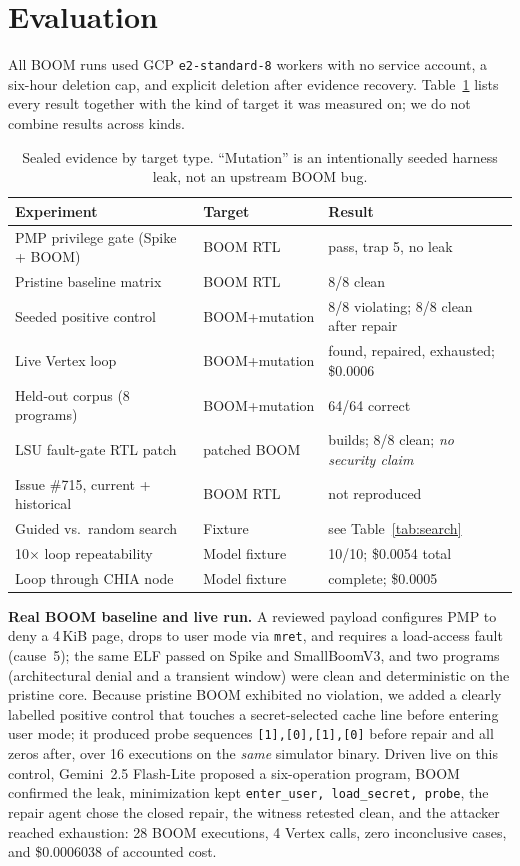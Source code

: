 \documentclass[conference,10pt]{IEEEtran}
\begin{document}
\section{Evaluation}\label{sec:eval}
All BOOM runs used GCP \texttt{e2-standard-8} workers with no service account,
a six-hour deletion cap, and explicit deletion after evidence recovery.
Table~\ref{tab:evidence} lists every result together with the kind of
target it was measured on; we do not combine results across kinds.

\begin{table}[t]
\centering
\caption{Sealed evidence by target type. ``Mutation'' is an intentionally
seeded harness leak, not an upstream BOOM bug.}
\label{tab:evidence}
\footnotesize
\setlength{\tabcolsep}{3pt}
\begin{tabular}{@{}p{}p{}p{}@{}}
\toprule
Experiment & Target & Result \\
\midrule
PMP privilege gate (Spike + BOOM) & BOOM RTL & pass, trap 5, no leak \\
Pristine baseline matrix & BOOM RTL & 8/8 clean \\
Seeded positive control & BOOM+mutation & 8/8 violating; 8/8 clean after repair \\
Live Vertex loop & BOOM+mutation & found, repaired, exhausted; \$0.0006 \\
Held-out corpus (8 programs) & BOOM+mutation & 64/64 correct \\
LSU fault-gate RTL patch & patched BOOM & builds; 8/8 clean; \emph{no security claim} \\
Issue \#715, current + historical & BOOM RTL & not reproduced \\
Guided vs.\ random search & Fixture & see Table~\ref{tab:search} \\
10$\times$ loop repeatability & Model fixture & 10/10; \$0.0054 total \\
Loop through CHIA node & Model fixture & complete; \$0.0005 \\
\bottomrule
\end{tabular}
\end{table}

\textbf{Real BOOM baseline and live run.} A reviewed payload configures PMP to
deny a 4\,KiB page, drops to user mode via \texttt{mret}, and requires a
load-access fault (cause~5); the same ELF passed on Spike and SmallBoomV3, and two
programs (architectural denial and a transient window) were clean and
deterministic on the pristine core. Because pristine BOOM exhibited no violation,
we added a clearly labelled positive control that touches a secret-selected cache
line before entering user mode; it produced probe sequences
\texttt{[1],[0],[1],[0]} before repair and all zeros after, over 16 executions on
the \emph{same} simulator binary. Driven live on this control, Gemini~2.5
Flash-Lite proposed a six-operation program, BOOM confirmed the leak,
minimization kept \texttt{enter\_user, load\_secret, probe}, the repair agent
chose the closed repair, the witness retested clean, and the attacker reached
exhaustion: 28 BOOM executions, 4 Vertex calls, zero inconclusive cases, and
\$0.0006038 of accounted cost.
\end{document}
